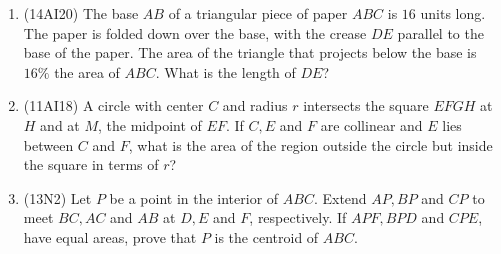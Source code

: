 \documentclass[10pt,paper=letter]{scrartcl}
\begin{document}
\begin{enumerate}
\item (14AI20) The base $AB$ of a triangular piece of paper $ABC$ is $16$ units long. The paper is folded down over the base, with the crease $DE$ parallel to the base of the paper. The area of the triangle that projects below the base is $16\%$ the area of $ABC$. What is the length of $DE$?

\item (11AI18) A circle with center $C$ and radius $r$ intersects the square $EFGH$ at $H$ and at $M$, the midpoint of $EF$. If $C, E$ and $F$ are collinear and $E$ lies between $C$ and $F$, what is the area of the region outside the circle but inside the square in terms of $r$?

\item (13N2) Let $P$ be a point in the interior of $ABC$. Extend $AP, BP$ and $CP$ to meet $BC, AC$ and $AB$ at $D, E$ and $F$, respectively. If $APF, BPD$ and $CPE$, have equal areas, prove that $P$ is the centroid of $ABC$.

\end{enumerate}
\end{document}
